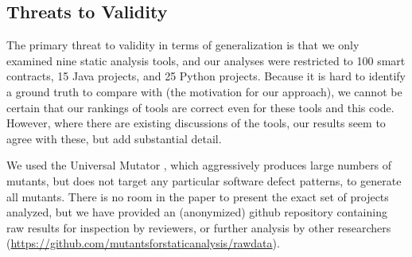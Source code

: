 \subsection{Threats to Validity}

The primary threat to validity in terms of generalization is that we only examined nine static analysis tools, and our analyses were restricted to 100 smart contracts, 15 Java projects, and 25 Python projects.   Because it is hard to identify a ground truth to compare with (the motivation for our approach), we cannot be certain that our rankings of tools are correct even for these tools and this code.  However, where there are existing discussions of the tools, our results seem to agree with these, but add substantial detail.

We used the Universal Mutator \cite{universalmutator,regexpMut}, which aggressively produces large numbers of mutants, but does not target any particular software defect patterns, to generate all mutants.
There is no room in the paper to present the exact set of projects analyzed, but we have provided an (anonymized) github repository containing raw results for inspection by reviewers, or further analysis by other researchers (\url{https://github.com/mutantsforstaticanalysis/rawdata}).